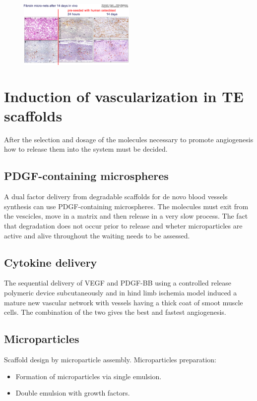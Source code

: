 	\begin{figure}[h]
		\centering
		\includegraphics[width=0.5\textwidth]{fibroin}
		\caption{\label{fig:fibroin}}
	\end{figure}

\section{Induction of vascularization in TE scaffolds}
After the selection and dosage of the molecules necessary to promote angiogenesis how to release them into the system must be decided.

	\subsection{PDGF-containing microspheres}
	A dual factor delivery from degradable scaffolds for de novo blood vessels synthesis can use PDGF-containing microspheres.
	The molecules must exit from the vescicles, move in a matrix and then release in a very slow process.
	The fact that degradation does not occur prior to release and wheter microparticles are active and alive throughout the waiting needs to be assessed.

	\subsection{Cytokine delivery}
	The sequential delivery of VEGF and PDGF-BB using a controlled release polymeric device subcutaneously and in hind limb ischemia model induced a mature new vascular network with vessels having a thick coat of smoot muscle cells.
	The combination of the two gives the best and fastest angiogenesis.

	\subsection{Microparticles}
	Scaffold design by microparticle assembly.
	Microparticles preparation:

	\begin{multicols}{2}
		\begin{itemize}
			\item Formation of microparticles via single emulsion.
			\item Double emulsion with growth factors.
		\end{itemize}
	\end{multicols}

